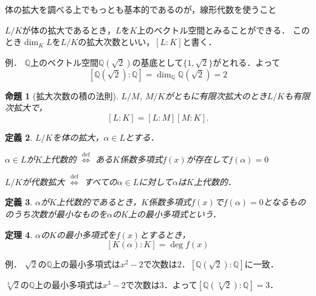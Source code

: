 \documentclass[dvipdfmx,17pt]{beamer}
\theoremstyle{plain}
\newtheorem{thm}{定理}
\newtheorem{defi}[thm]{定義}
\newtheorem{prop}[thm]{命題}
\newcommand{\Q}{\mathbb{Q}}
\begin{document}
\begin{frame}
体の拡大を調べる上でもっとも基本的であるのが，線形代数を使うこと

$L/K$が体の拡大であるとき，$L$を$K$上のベクトル空間とみることができる．
このとき$\dim_K L$を$L/K$の拡大次数といい，$[L:K]$と書く．
\end{frame}

\begin{frame}
例． $\Q$上のベクトル空間$\Q(\sqrt{2})$の基底として$\{1, \sqrt{2}\}$がとれる．よって
\[ [\Q(\sqrt{2}):\Q] = \dim_\Q \Q(\sqrt{2}) = 2 \]
\end{frame}

\begin{frame}
\begin{prop}[拡大次数の積の法則]
$L/M$, $M/K$がともに有限次拡大のとき$L/K$も有限次拡大で，
\[ [L:K] = [L:M][M:K]. \]
\end{prop}
\end{frame}

\begin{frame}
\begin{defi}
$L/K$を体の拡大，$\alpha \in L$とする．

$\alpha \in L$が$K$上代数的 $\overset{\mathrm{def}}{\iff}$ ある$K$係数多項式$f(x)$が存在して$f(\alpha) = 0$

$L/K$が代数拡大 $\overset{\mathrm{def}}{\iff}$ すべての$\alpha \in L$に対して$\alpha$は$K$上代数的．
\end{defi}
\end{frame}

\begin{frame}
\begin{defi}
$\alpha$が$K$上代数的であるとき，$K$係数多項式$f(x)$で$f(\alpha) = 0$となるもののうち次数が最小なものを$\alpha$の$K$上の最小多項式という．
\end{defi}
\end{frame}

\begin{frame}
\begin{thm}
$\alpha$の$K$の最小多項式を$f(x)$とするとき，
\[ [K(\alpha) : K] = \deg f(x) \]
\end{thm}
\end{frame}

\begin{frame}
例． $\sqrt{2}$の$\Q$上の最小多項式は$x^2-2$で次数は$2$．$[\Q(\sqrt{2}):\Q]$に一致．

$\sqrt[3]{2}$の$\Q$上の最小多項式は$x^3-2$で次数は$3$．よって$[\Q(\sqrt[3]{2}):\Q] = 3$．
\end{frame}
\end{document}
